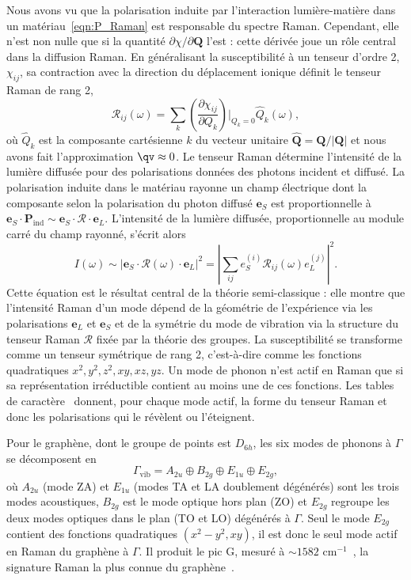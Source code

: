 Nous avons vu que la polarisation induite par l'interaction lumière-matière dans un matériau~\eqref{eqn:P_Raman} est responsable du spectre Raman. Cependant, elle n'est non nulle que si la quantité $\partial\chi/\partial\mathbf{Q}$ l'est : cette dérivée joue un rôle central dans la diffusion Raman. En généralisant la susceptibilité à un tenseur d'ordre 2, $\chi_{ij}$, sa contraction avec la direction du déplacement ionique définit le tenseur Raman de rang 2,
\begin{equation}
    \mathcal{R}_{ij}(\omega)=\sum_k\left(\frac{\partial\chi_{ij}}{\partial Q_k}\right)\bigg\rvert_{Q_k=0}\hat{Q}_k(\omega),
\end{equation}
où $\hat{Q}_k$ est la composante cartésienne $k$ du vecteur unitaire $\hat{\mathbf{Q}}=\mathbf{Q}/|\mathbf{Q}|$ et nous avons fait l'approximation $\qv\approx 0$. Le tenseur Raman détermine l'intensité de la lumière diffusée pour des polarisations données des photons incident et diffusé. La polarisation induite dans le matériau rayonne un champ électrique dont la composante selon la polarisation du photon diffusé $\mathbf{e}_S$ est proportionnelle à $\mathbf{e}_S\cdot\mathbf{P}_\text{ind} \sim \mathbf{e}_S\cdot\bm{\mathcal{R}}\cdot\mathbf{e}_L$. L'intensité de la lumière diffusée, proportionnelle au module carré du champ rayonné, s'écrit alors
\begin{equation}
    I(\omega) \sim \left|\mathbf{e}_S\cdot\bm{\mathcal{R}}(\omega)\cdot\mathbf{e}_L\right|^2 = \left|\sum_{ij}e_S^{(i)}\mathcal{R}_{ij}(\omega)e_L^{(j)}\right|^2.
\end{equation}
Cette équation est le résultat central de la théorie semi-classique : elle montre que l'intensité Raman d'un mode dépend de la géométrie de l'expérience via les polarisations $\mathbf{e}_L$ et $\mathbf{e}_S$ et de la symétrie du mode de vibration via la structure du tenseur Raman $\bm{\mathcal{R}}$ fixée par la théorie des groupes. La susceptibilité se transforme comme un tenseur symétrique de rang 2, c'est-à-dire comme les fonctions quadratiques $x^2, y^2, z^2, xy, xz, yz$. Un mode de phonon n'est actif en Raman que si sa représentation irréductible contient au moins une de ces fonctions. Les tables de caractère~\cite{SymmetrySpectroscopy,GroupTheory2008} donnent, pour chaque mode actif, la forme du tenseur Raman et donc les polarisations qui le révèlent ou l'éteignent. 

Pour le graphène, dont le groupe de points est $D_{6h}$, les six modes de phonons à $\Gamma$ se décomposent en
\begin{equation}
    \Gamma_\text{vib} = A_{2u}\oplus B_{2g}\oplus E_{1u}\oplus E_{2g},
\end{equation}
où $A_{2u}$ (mode ZA) et $E_{1u}$ (modes TA et LA doublement dégénérés) sont les trois modes acoustiques, $B_{2g}$ est le mode optique hors plan (ZO) et $E_{2g}$ regroupe les deux modes optiques dans le plan (TO et LO) dégénérés à $\Gamma$. Seul le mode $E_{2g}$ contient des fonctions quadratiques $(x^2-y^2, xy)$, il est donc le seul mode actif en Raman du graphène à $\Gamma$. Il produit le pic G, mesuré à $\sim 1582$ cm$^{-1}$~\cite{ferrariRamanSpectrumGraphene2006,ferrariRamanSpectroscopyVersatile2013a}, la signature Raman la plus connue du graphène~\cite{ferrariRamanSpectroscopyAmorphous2004}.

